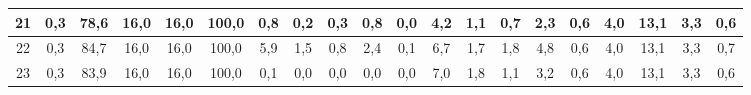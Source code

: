 \begin{sidewaystable}[]
\begin{tabular}{|c|c|c|c|c|c|c|c|c|c|c|c|c|c|c|c|c|c|c|c|}
    21 & 0,3                                              & 78,6                                            & 16,0                                            & 16,0                                            & 100,0                                           & 0,8                                             & 0,2                                             & 0,3                                             & 0,8                                             & 0,0                                             & 4,2                                              & 1,1                                              & 0,7                                              & 2,3                                              & 0,6                                              & 4,0                                              & 13,1                                             & 3,3                                              & 0,6                                              \\ \hline
    22 & 0,3                                              & 84,7                                            & 16,0                                            & 16,0                                            & 100,0                                           & 5,9                                             & 1,5                                             & 0,8                                             & 2,4                                             & 0,1                                             & 6,7                                              & 1,7                                              & 1,8                                              & 4,8                                              & 0,6                                              & 4,0                                              & 13,1                                             & 3,3                                              & 0,7                                              \\ \hline
    23 & 0,3                                              & 83,9                                            & 16,0                                            & 16,0                                            & 100,0                                           & 0,1                                             & 0,0                                             & 0,0                                             & 0,0                                             & 0,0                                             & 7,0                                              & 1,8                                              & 1,1                                              & 3,2                                              & 0,6                                              & 4,0                                              & 13,1                                             & 3,3                                              & 0,6                                              \\ \hline

\end{tabular}
\end{sidewaystable}
